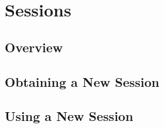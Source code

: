 
\chapter{Sessions}

\section{Overview}

\section{Obtaining a New Session}

\section{Using a New Session}
